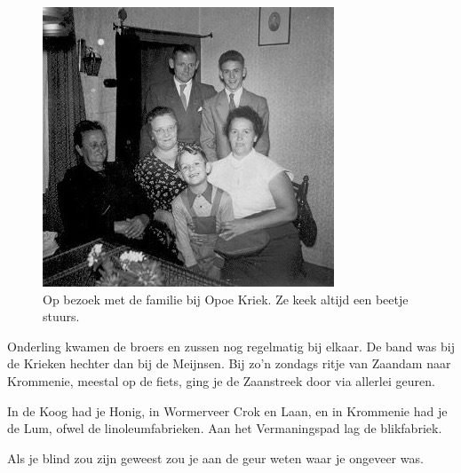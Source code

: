 \documentclass[12pt,twoside, openright]{memoir}
\begin{document}
\begin{figure}
\includegraphics[width=\textwidth]{img/ch3/opbezoek}
\caption*{\footnotesize Op bezoek met de familie bij Opoe Kriek. Ze keek altijd een beetje stuurs.}
\end{figure}

Onderling kwamen de broers en zussen nog regelmatig bij elkaar. De band was bij de Krieken hechter dan bij de Meijnsen. Bij zo’n zondags ritje van Zaandam naar Krommenie, meestal op de fiets, ging je de Zaanstreek door via allerlei geuren. 

In de Koog had je Honig, in Wormerveer Crok en Laan, en in Krommenie had je de Lum, ofwel de linoleumfabrieken. Aan het Vermaningspad lag de blikfabriek. 

Als je blind zou zijn geweest zou je aan de geur weten waar je ongeveer was. 
\end{document}
